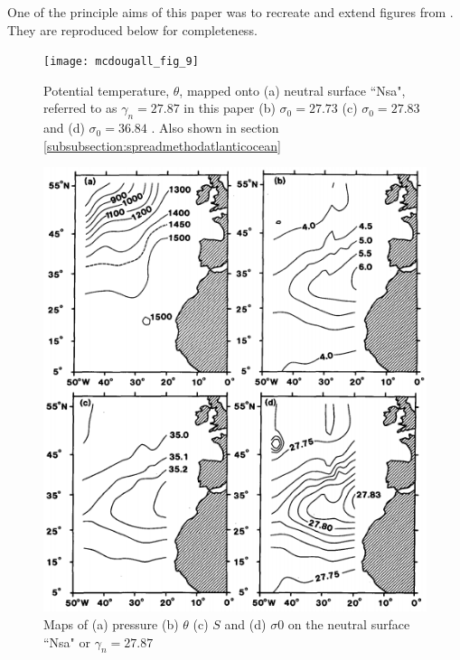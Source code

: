\label{appendix_a}

One of the principle aims of this paper was to recreate and extend figures from \citet{McDougall1987}. They are reproduced below for completeness. 

\begin{figure}[htbp]
    \centering
    \texttt{[image: mcdougall\_fig\_9]}
    \caption{Potential temperature, $\theta$, mapped onto (a) neutral surface ``Nsa", referred to as $\gamma_n = 27.87$ in this paper (b) $\sigma_0 = 27.73$ (c) $\sigma_0 = 27.83$ and (d) $\sigma_0 = 36.84$ \citep{McDougall1987}. Also shown in section \ref{subsubsection:spreadmethodatlanticocean}}
    \label{fig:appendix_mcdougall_theta_spread}
\end{figure}

\begin{figure}[htbp]
    \centering
    \includegraphics{plots/mc_dougall_fig_6.PNG}
    \caption{Maps of (a) pressure (b) $\theta$ (c) $S$ and (d) $\sigma0$ on the neutral surface ``Nsa" or $\gamma_n = 27.87$ \citep{McDougall1987}}
    \label{fig:appendix_mcdougall_neutral_surface_maps}
\end{figure}